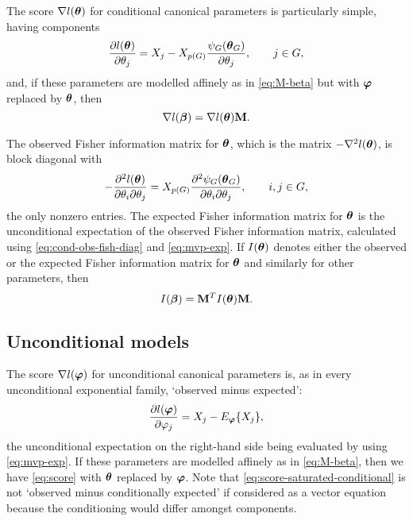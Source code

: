 The score $\nabla l({\boldsymbol{\theta}})$ for conditional canonical parameters
is particularly simple, having components
\begin{equation} \label{eq:score-saturated-conditional}
   \frac{\partial l({\boldsymbol{\theta}})}{\partial \theta_j}
   =
   X_j - X_{p(G)} \frac{\psi_G({\boldsymbol{\theta}}_G)}{\partial \theta_j},
   \qquad j \in G,
\end{equation}
and, if these parameters are modelled affinely as in
\eqref{eq:M-beta} but with ${\boldsymbol{\varphi}}$ replaced by ${\boldsymbol{\theta}}$,
then
\begin{equation} \label{eq:score}
   \nabla l({\boldsymbol{\beta}})
   =
   \nabla l({\boldsymbol{\theta}}) \mathbf{M}.
\end{equation}

The observed Fisher information matrix for ${\boldsymbol{\theta}}$, which is the matrix
$- \nabla^2 l({\boldsymbol{\theta}})$, is block diagonal with
\begin{equation} \label{eq:cond-obs-fish-diag}
   - \frac{\partial^2 l({\boldsymbol{\theta}})}{\partial \theta_i \partial \theta_j}
   =
   X_{p(G)} \frac{\partial^2 \psi_G({\boldsymbol{\theta}}_G)}{\partial \theta_i \partial \theta_j},
   \qquad i, j \in G,
\end{equation}
the only nonzero entries.
The expected Fisher information matrix for ${\boldsymbol{\theta}}$ is the unconditional expectation
of the observed Fisher information matrix, calculated using
\eqref{eq:cond-obs-fish-diag} and \eqref{eq:mvp-exp}.
If $I({\boldsymbol{\theta}})$ denotes either the observed or the expected Fisher information matrix
for ${\boldsymbol{\theta}}$ and similarly for other parameters, then
\begin{equation} \label{eq:cond-obs-fish}
   I({\boldsymbol{\beta}})
   =
   \mathbf{M}^T I({\boldsymbol{\theta}}) \mathbf{M}.
\end{equation}

\subsection{Unconditional models} \label{sec:FEFth}


The score $\nabla l({\boldsymbol{\varphi}})$ for unconditional canonical parameters is,
as in every unconditional exponential family, `observed minus expected':
$$
   \frac{\partial l({\boldsymbol{\varphi}})}{\partial \varphi_j}
   =
   X_j - E_{\boldsymbol{\varphi}} \{ X_j \},
$$
the unconditional expectation on the right-hand side being evaluated
by using \eqref{eq:mvp-exp}.
If these parameters are modelled affinely as in
\eqref{eq:M-beta},
then we have \eqref{eq:score} with ${\boldsymbol{\theta}}$ replaced by ${\boldsymbol{\varphi}}$.
Note that \eqref{eq:score-saturated-conditional} is not
`observed minus conditionally expected' if considered as a vector equation
because the conditioning would differ amongst components.

